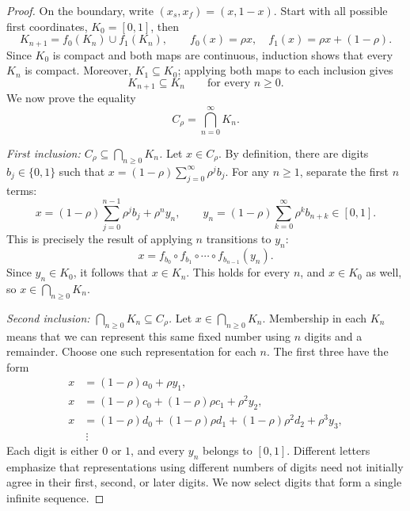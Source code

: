 \documentclass[11pt]{article}
\begin{document}
\begin{proof}
On the boundary, write $(x_s,x_f)=(x,1-x)$. Start with all possible
first coordinates, $K_0=[0,1]$, then 
\begin{equation*}
K_{n+1}=f_0(K_n)\cup f_1(K_n),
\qquad f_0(x)=\rho x,\quad f_1(x)=\rho x+(1-\rho).
\end{equation*}
Since $K_0$ is compact and both maps are continuous, induction shows
that every $K_n$ is compact. Moreover, $K_1\subseteq K_0$; applying
both maps to each inclusion gives
\begin{equation*}
K_{n+1}\subseteq K_n\qquad\text{for every }n\geq0.
\end{equation*}
We now prove the equality
\begin{equation*}
C_\rho=\bigcap_{n=0}^{\infty}K_n.
\end{equation*}

\medskip
\noindent\textit{First inclusion: $C_\rho\subseteq\bigcap_{n\geq0}K_n$.}
Let $x\in C_\rho$. By definition, there are digits $b_j\in\{0,1\}$
such that $x=(1-\rho)\sum_{j=0}^{\infty}\rho^j b_j$.
For any $n\geq1$, separate the first $n$ terms:
\begin{equation*}
x=(1-\rho)\sum_{j=0}^{n-1}\rho^j b_j+\rho^n y_n,
\qquad
y_n=(1-\rho)\sum_{k=0}^{\infty}\rho^k b_{n+k}\in[0,1].
\end{equation*}
This is precisely the result of applying $n$ transitions to $y_n$:
\begin{equation*}
x=f_{b_0}\circ f_{b_1}\circ\cdots\circ f_{b_{n-1}}(y_n).
\end{equation*}
Since $y_n\in K_0$, it follows that $x\in K_n$. This holds for every
$n$, and $x\in K_0$ as well, so $x\in\bigcap_{n\geq0}K_n$.

\medskip
\noindent\textit{Second inclusion: $\bigcap_{n\geq0}K_n\subseteq C_\rho$.}
Let $x\in\bigcap_{n\geq0}K_n$. Membership in each $K_n$ means that
we can represent this same fixed number using $n$ digits and a remainder.
Choose one such representation for each $n$. The first three have the form
\begin{align*}
x&=(1-\rho)a_0+\rho y_1,\\
x&=(1-\rho)c_0+(1-\rho)\rho c_1+\rho^2y_2,\\
x&=(1-\rho)d_0+(1-\rho)\rho d_1
  +(1-\rho)\rho^2d_2+\rho^3y_3,\\
&\ \vdots
\end{align*}
Each digit is either $0$ or $1$, and every $y_n$ belongs to $[0,1]$.
Different letters emphasize that representations using different numbers
of digits need not initially agree in their first, second, or later digits.
We now select digits that form a single infinite sequence.


\end{proof}
\end{document}
